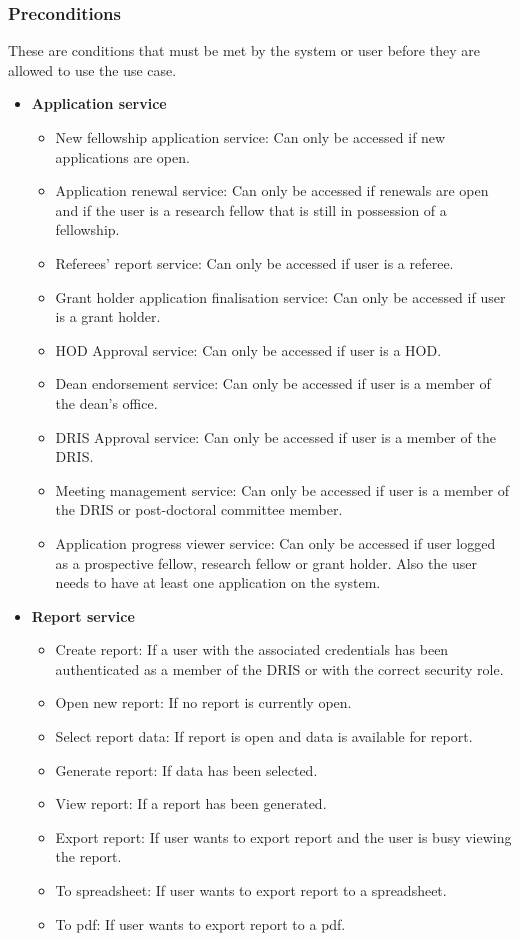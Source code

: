 \documentclass[12pt]{article}
\begin{document}
\subsubsection{Preconditions}
These are conditions that must be met by the system or user before they are allowed to use the use case.\\
\begin{itemize}
	\item\textbf{ Application service}
		\begin{itemize}
			\item New fellowship application service: Can only be accessed if new applications are open.
			\item Application renewal service: Can only be accessed if renewals are open and if the user is a research fellow that is still in possession of a fellowship.
			\item Referees' report service:  Can only be accessed if user is a referee.
			\item Grant holder application finalisation service:  Can only be accessed if user is a grant holder.
			\item HOD Approval service:  Can only be accessed if user is a HOD.
			\item Dean endorsement service:  Can only be accessed if user is a member of the dean's office.
			\item DRIS Approval service:  Can only be accessed if user is a member of the DRIS.
			\item Meeting management service:  Can only be accessed if user is a member of the DRIS or post-doctoral committee member.
			\item Application progress viewer service: Can only be accessed if user logged as a prospective fellow, research fellow or grant holder. Also the user needs to have at least one application on the system.	
		\end{itemize}
	
	\item \textbf{Report service}
		\begin{itemize}
			\item Create report: If a user with the associated credentials has been authenticated as a member of the DRIS or with the correct security role.
			\item Open new report: If no report is currently open.
			\item Select report data: If report is open and data is available for report.
			\item Generate report: If data has been selected.
			\item View report: If a report has been generated.
			\item Export report: If user wants to export report and the user is busy viewing the report.
			\item To spreadsheet: If user wants to export report to a spreadsheet.
			\item To pdf: If user wants to export report to a pdf.	
		\end{itemize}
	

\end{itemize}
\end{document}
